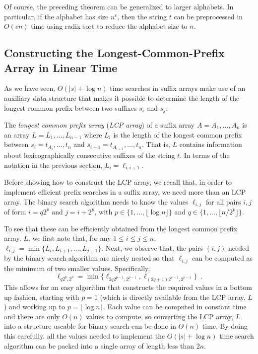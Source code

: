 Of course, the preceding theorem can be generalized to larger
alphabets. In particular, if the alphabet has size $n^c$, then the string
$t$ can be preprocessed in $O(cn)$ time using radix sort to reduce the
alphabet size to $n$.

\subsection{Constructing the Longest-Common-Prefix Array in Linear Time}

As we have seen, $O(|s|+\log n)$ time searches in suffix arrays make use
of an auxiliary data structure that makes it possible to determine the
length of the longest common prefix between two suffixes $s_i$ and $s_j$.

The \emph{longest common prefix array} (\emph{LCP array}) of a suffix
array $A=A_1,\ldots,A_n$ is an array $L=L_1,\ldots,L_{n-1}$ where $L_i$ is
the length of the longest common prefix between $s_i=t_{A_i},\ldots,t_n$
and $s_{i+1}=t_{A_{i+1}},\ldots,t_n$.  That is, $L$ contains information
about lexicographically consecutive suffixes of the string $t$.  In terms
of the notation in the previous section, $L_i=\ell_{i,i+1}$.

Before showing how to construct the LCP array, we recall that, in order
to implement efficient prefix searches in a suffix array, we need more
than an LCP array.  The binary search algorithm needs to know the values
$\ell_{i,j}$ for all pairs $i,j$ of form $i=q2^p$ and $j=i+2^{p}$, with
$p\in\{1,\ldots,\lfloor \log n\rfloor\}$ and $q\in\{1,\ldots,\lfloor
n/2^p\rfloor\}$.

To see that these can be efficiently obtained from the longest common
prefix array, $L$, we first note that, for any $1\le i\le j\le n$,
$\ell_{i,j}=\min\{L_i,L_{i+1},\ldots,L_{j-1}\}$.  Next, we observe that,
the pairs $(i,j)$ needed by the binary search algorithm are nicely nested
so that $\ell_{i,j}$ can be computed as the minimum of two smaller values.
Specifically,
\[
    \ell_{q2^p,2^{p}} = \min\{\ell_{2q 2^{p-1},2^{p-1}}, \ell_{(2q+1) 2^{p-1},2^{p-1}}\} \enspace .
\]
This allows for an easy algorithm that constructs the required values in
a bottom up fashion, starting with $p=1$ (which is directly available
from the LCP array, $L$) and working up to $p=\lfloor\log n\rfloor$.
Each value can be computed in constant time and there are only $O(n)$
values to compute, so converting the LCP array, $L$ into a structure
useable for binary search can be done in $O(n)$ time.  By doing this
carefully, all the values needed to implement the $O(|s|+\log n)$
time search algorithm can be packed into a single array of length less
than $2n$.

